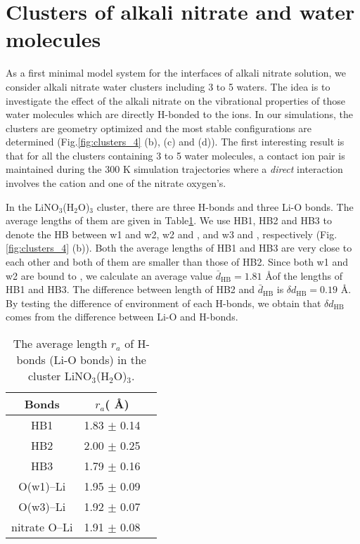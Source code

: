   \section{Clusters of alkali nitrate and water molecules}\label{paragraph_clusters_alkali_nitrate_and_water_molecules}
  As a first minimal model system for the interfaces of alkali nitrate solution, we consider alkali nitrate water clusters including 3 to 5 waters. 
  The idea is to investigate the effect of the alkali nitrate on the vibrational properties of those water molecules which are directly 
  H-bonded to the ions.
  In our simulations, the clusters are geometry optimized and the most stable configurations are determined (Fig.\thinspace\ref{fig:clusters_4} (b), (c) and (d)).
  The first interesting result is that for all the clusters containing 3 to 5 water molecules, a contact ion pair is maintained during the 
  300 K simulation trajectories where a \emph{direct} interaction involves the cation and one of the nitrate oxygen's. 

In the LiNO$_3$(H$_2$O)$_3$ cluster, there are three H-bonds and three Li-O bonds. 
The average lengths of them are given in Table\thinspace\ref{tab:table_lino3}. 
We use HB1, HB2 and HB3 to denote the HB between w1 and w2, w2 and \nitrate, and w3 and \nitrate, 
respectively (Fig.\thinspace\ref{fig:clusters_4} (b)). Both the average lengths of HB1 and HB3 are very close 
to each other and both of them are smaller than those of HB2. 
Since both w1 and w2 are bound to \li, we calculate an average value $\bar{d}_{\text{HB}}=1.81$ \AA of the lengths of HB1 and HB3.
The difference between length of HB2 and $\bar{d}_{\text{HB}}$ is $\delta d_{\text{HB}}=0.19$ \AA.
By testing the difference of environment of each H-bonds,  we obtain that $\delta d_{\text{HB}}$ comes from the 
difference between Li-O  and H-bonds.
\begin{table}[htbp]
\centering
\caption{\label{tab:table_lino3}%
  The average length $r_a$ of H-bonds (Li-O bonds) in the cluster LiNO$_3$(H$_2$O)$_3$.}
\begin{tabular}{ccc}
Bonds& $r_a$( \AA) \\ 
\hline
HB1 &1.83 $\pm$ 0.14\\
HB2 &2.00 $\pm$ 0.25 \\
HB3 &1.79 $\pm$ 0.16 \\
O(w1)--Li &1.95 $\pm$ 0.09 \\
O(w3)--Li &1.92 $\pm$ 0.07 \\
nitrate O--Li &1.91 $\pm$ 0.08
\end{tabular}
\end{table}

